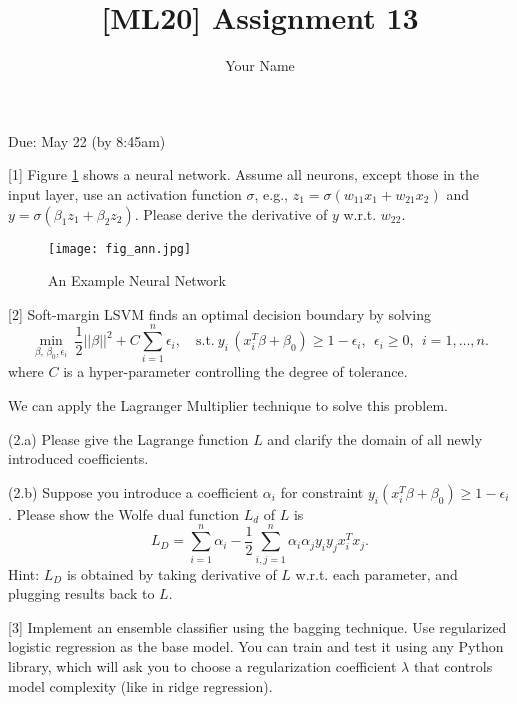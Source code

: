 \documentclass{llncs}
\title{[ML20] Assignment 13}
\author{Your Name}
\institute{}
\begin{document}
\maketitle 

\setlength\parindent{0pt} 
\setlength{\parskip}{10pt}

Due: May 22 (by 8:45am) 

[1] Figure \ref{fig:hw13_ann} shows a 
neural network. Assume all neurons, except 
those in the input layer, use an activation
function $\sigma$, e.g., 
$z_{1} = \sigma(w_{11} x_{1} + w_{21} x_{2})$
and $y = \sigma(\beta_{1} z_{1} + \beta_{2} z_{2})$. 
Please derive the derivative of $y$ 
w.r.t. $w_{22}$. 

\begin{figure}[h!]
\centering
\texttt{[image: fig\_ann.jpg]}
\caption{An Example Neural Network}
\label{fig:hw13_ann}
\end{figure}

\newpage 

[2] Soft-margin LSVM finds an optimal 
decision boundary by solving 
\begin{equation}
\min_{\beta,\,\beta_{0}, \epsilon_{i}}\ 
\frac{1}{2} ||\beta||^{2} 
+ C \sum_{i=1}^{n} \epsilon_{i},\quad  
\text{s.t.}\ y_{i}\, (x_{i}^{T} \beta 
+ \beta_{0}) \geq 1 - \epsilon_{i},\ \ 
\epsilon_{i} \geq 0, \ \ i = 1, \ldots, n.
\end{equation}
where $C$ is a hyper-parameter controlling 
the degree of tolerance. 

We can apply the Lagranger Multiplier 
technique to solve this problem. 

(2.a) Please give the Lagrange function
$L$ and clarify the domain of all 
newly introduced coefficients. 

(2.b) Suppose you introduce a coefficient 
$\alpha_{i}$ for constraint $y_{i}(x_{i}^{T} \beta + \beta_{0}) \geq 1 - \epsilon_{i}$. 
Please show the Wolfe dual function $L_{d}$
of $L$ is 
\begin{equation}
L_{D} = \sum_{i = 1}^{n} \alpha_{i} 
- \frac{1}{2} \sum_{i,j=1}^{n} 
\alpha_{i} \alpha_{j} y_{i} y_{j} 
x_{i}^{T}x_{j}. 
\end{equation}
Hint: $L_{D}$ is obtained by 
taking derivative of $L$ w.r.t. 
each parameter, and plugging results 
back to $L$.    

\newpage 

[3] Implement an ensemble classifier 
using the bagging technique. 
Use regularized logistic regression 
as the base model. You can train and 
test it using any Python library, 
which will ask you to choose a
regularization coefficient $\lambda$ 
that controls model complexity 
(like in ridge regression). 
\end{document}
